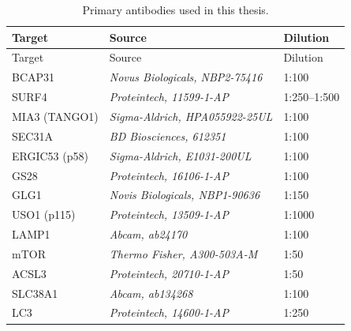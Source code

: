 \documentclass[
  12pt,
  a4paper,
]{book}
\begin{document}
\begin{longtable}[]{@{}lll@{}}
\caption{\label{tab:primary-table}Primary antibodies used in this thesis.}\tabularnewline
\toprule()
Target & Source & Dilution \\
\midrule()
\endfirsthead
\toprule()
Target & Source & Dilution \\
\midrule()
\endhead
BCAP31 & \emph{Novus Biologicals, NBP2-75416} & 1:100 \\
SURF4 & \emph{Proteintech, 11599-1-AP} & 1:250--1:500 \\
MIA3 (TANGO1) & \emph{Sigma-Aldrich, HPA055922-25UL} & 1:100 \\
SEC31A & \emph{BD Biosciences, 612351} & 1:100 \\
ERGIC53 (p58) & \emph{Sigma-Aldrich, E1031-200UL} & 1:100 \\
GS28 & \emph{Proteintech, 16106-1-AP} & 1:100 \\
GLG1 & \emph{Novis Biologicals, NBP1-90636} & 1:150 \\
USO1 (p115) & \emph{Proteintech, 13509-1-AP} & 1:1000 \\
LAMP1 & \emph{Abcam, ab24170} & 1:100 \\
mTOR & \emph{Thermo Fisher, A300-503A-M} & 1:50 \\
ACSL3 & \emph{Proteintech, 20710-1-AP} & 1:50 \\
SLC38A1 & \emph{Abcam, ab134268} & 1:100 \\
LC3 & \emph{Proteintech, 14600-1-AP} & 1:250 \\
\bottomrule()
\end{longtable}
\end{document}
